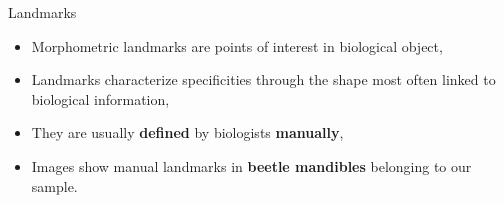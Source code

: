 \documentclass{LaBRI_poster}
\begin{document}
\begin{frame}[t]
\begin{columns}[t]
\begin{column}{\twothirdcolwidth}
 \begin{block}{Landmarks}
 	\begin{itemize}
  		\item Morphometric landmarks are points of interest in biological object,\\[0.3cm]
  		\item Landmarks characterize specificities through the shape most often linked to biological information,\\[0.3cm]
  		\item They are usually \textbf{defined} by biologists \textbf{manually},\\[0.3cm]
  		\item Images show manual landmarks in \textbf{beetle mandibles} belonging to our sample. 
  	\end{itemize}
 	

\end{block}
\end{column}
\end{columns}
\end{frame}
\end{document}
